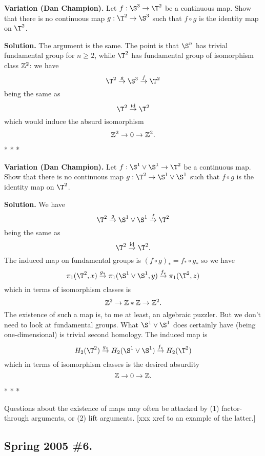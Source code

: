 \documentclass[10pt]{article}
\numberwithin{equation}{subsection}
\begin{document}
\textbf{Variation (Dan Champion).}  
Let $f:\S^3 \to \T^2$ be a continuous map.  Show that there is no continuous
map $g:\T^2 \to \S^3$ such that $f \circ g$ is the identity map on $\T^2$.

\textbf{Solution.}
The argument is the same.  The point is that $\S^n$ has trivial fundamental
group for $n \ge 2$, while $\T^2$ has fundamental group of isomorphism class
$\mathbb{Z}^2$:  we have
$$
	\T^2 \stackrel{g}{\to} \S^3 \stackrel{f}{\to} \T^2
$$
being the same as
$$
	\T^2 \stackrel{\id}{\to} \T^2
$$
which would induce the absurd isomorphism
$$
	\mathbb{Z}^2 \to 0 \to \mathbb{Z}^2.
$$

\begin{center}* * *\end{center}

\textbf{Variation (Dan Champion).}  
Let $f:\S^1 \vee \S^1 \to \T^2$ be a continuous map.  Show that there is no
continuous map $g:\T^2 \to \S^1 \vee \S^1$ such that $f \circ g$ is the identity
map on $\T^2$.

\textbf{Solution.}  We have
$$
	\T^2 \stackrel{g}{\to} \S^1 \vee \S^1 \stackrel{f}{\to} \T^2
$$
being the same as
$$
	\T^2 \stackrel{\id}{\to} \T^2.
$$
The induced map on fundamental groups is $(f \circ g)_* = f_* \circ g_*$ so
we have
$$
	\pi_1(\T^2,x) \stackrel{g_*}{\to}
	\pi_1(\S^1 \vee \S^1,y) \stackrel{f_*}{\to}
	\pi_1(\T^2,z)
$$
which in terms of isomorphism classes is
$$
	\mathbb{Z}^2 \to \mathbb{Z} * \mathbb{Z} \to \mathbb{Z}^2.
$$
The existence of such a map is, to me at least, an algebraic puzzler.
But we don't need to look at fundamental groups.  What $\S^1 \vee \S^1$
does certainly have (being one-dimensional) is trivial second homology.
The induced map is
$$
	H_2(\T^2) \stackrel{g_*}{\to}
	H_2(\S^1 \vee \S^1) \stackrel{f_*}{\to}
	H_2(\T^2)
$$
which in terms of isomorphism classes is the desired absurdity
$$
	\mathbb{Z} \to 0 \to \mathbb{Z}.
$$

\begin{center}* * *\end{center}
\begin{rem*}
Questions about the existence of maps may often be attacked by (1)
factor-through arguments, or (2) lift arguments.  [xxx xref to an example of
the latter.]
\end{rem*}

\subsection{Spring 2005 \#6.}
\end{document}
